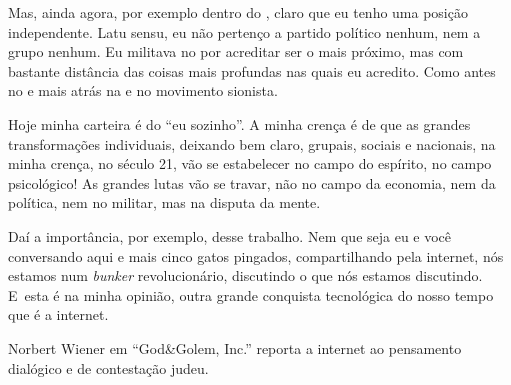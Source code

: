  

Mas, ainda agora, por exemplo dentro do , claro que eu tenho uma
posição independente. Latu sensu, eu não pertenço a partido político
nenhum, nem a grupo nenhum. Eu militava no  por acreditar ser o mais
próximo, mas com bastante distância das coisas mais profundas nas quais
eu acredito. Como antes no  e mais atrás na  e no movimento
sionista.

Hoje minha carteira é do ``eu sozinho''. A minha crença é de que as
grandes transformações individuais, deixando bem claro, grupais, sociais
e nacionais, na minha crença, no século 21, vão se estabelecer no campo
do espírito, no campo psicológico! As grandes lutas vão se travar, não
no campo da economia, nem da política, nem no militar, mas na disputa da
mente.

 

Daí a importância, por exemplo, desse trabalho. Nem que seja eu e você
conversando aqui e mais cinco gatos pingados, compartilhando pela
internet, nós estamos num \emph{bunker} revolucionário, discutindo o que nós
estamos discutindo. E~esta é na minha opinião, outra grande conquista
tecnológica do nosso tempo que é a internet.

 

Norbert Wiener em ``God\&Golem, Inc.'' reporta a internet ao pensamento
dialógico e de contestação judeu.%

\fechafala
